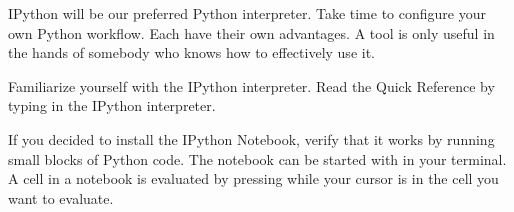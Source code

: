 IPython will be our preferred Python interpreter.  Take time to configure your own Python
workflow.  Each have their own advantages.  A tool is only useful in the hands of somebody
who knows how to effectively use it.
\begin{problem}
Familiarize yourself with the IPython interpreter.
Read the Quick Reference by typing  in the IPython interpreter.

If you decided to install the IPython Notebook, verify that it works by running small blocks of Python code.
The notebook can be started with  in your terminal.
A cell in a notebook is evaluated by pressing  while your cursor is in the cell you want to evaluate.
\end{problem}
